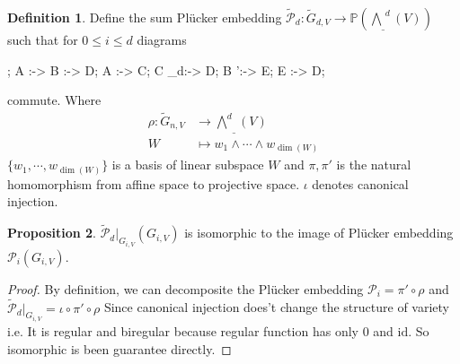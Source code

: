 \documentclass[10pt,UTF8]{article}
\theoremstyle{definition}
\renewcommand{\qed}{\rightline{$\qedsymbol$}}
\newcommand{\iden}{\text{id}}
\newtheorem{definition}{Definition}[section]
\newtheorem{proposition}[definition]{Proposition}
\newtheorem*{proof}{Proof}
\begin{document}
\begin{definition}
  Define the sum Plücker embedding $\tilde{\mathcal{P}}_d: \tilde{G}_{d,V}\to \mathbb{P}(\underline{\bigwedge}^d(V))$ such that for $0\le i\le d$ diagrams 


\newcommand{\tpd}{\tilde{\mathcal{P}}_d}
\newcommand{\pd}{{\mathcal{P}}_d}

\begin{center}
  \begin{codi}[tetragonal]
  ;
  \mor A \rho:-> B \pi:-> D;
  \mor A \iota:-> C;
  \mor C \tpd:-> D;
  \mor B \pi':-> E;
  \mor E \iota:-> D;
  \end{codi}
\end{center}
commute. Where 
\begin{align*}
  \rho:\tilde{G}_{{n},V} &\to {\underline{\bigwedge^{d}}}(V)\\
  W &\mapsto w_1\wedge \cdots \wedge w_{\dim(W)}
\end{align*}
$\{w_1,\cdots,w_{\dim(W)}\}$ is a basis of linear subspace $W$ and $\pi,\pi'$ is the natural homomorphism from affine space to projective space. 
$\iota$ denotes canonical injection.
\end{definition}

\begin{proposition}
  $\tilde{\mathcal{P}}_d|_{G_{{i},V}}(G_{{i},V})$ is isomorphic to the image of Plücker embedding $\mathcal{P}_i(G_{{i},V})$.\label{1}
\end{proposition}
\begin{proof}
  By definition, we can decomposite the Plücker embedding $\mathcal{P}_i =  \pi'\circ\rho $ and $\tilde{\mathcal{P}}_d|_{G_{{i},V}} =  \iota\circ \pi'\circ\rho$
  Since canonical injection does't change the structure of variety i.e. It is regular and biregular because regular function has only $0$ and $\iden$.
  So isomorphic  is been guarantee directly.

  \qed
\end{proof}
\end{document}
